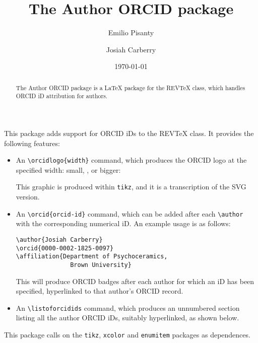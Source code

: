 \documentclass[%
  reprint,
  aps,
  pra,
  superscriptaddress,
  a4paper,
]{revtex4-2}
\begin{document}
\title{The Author ORCID package}

\author{Emilio Pisanty}

\author{Josiah Carberry}

\date{\today}

\begin{abstract}
The Author ORCID package is a {\LaTeX} package for the REVTeX class, which handles ORCID iD attribution for authors.
\end{abstract}

\maketitle


This package adds support for ORCID iDs to the REVTeX class. It provides the following features:

\begin{itemize}
\item
An \verb|\orcidlogo{width}| command, which produces the ORCID logo at the specified width: small, \orcidlogo{8pt}, or bigger:

\orcidlogo{20pt}

This graphic is produced within \texttt{tikz}, and it is a transcription of the SVG version.

\item
An \verb|\orcid{orcid-id}| command, which can be added after each \verb|\author| with the corresponding numerical iD. 
An example usage is as follows:
\begin{verbatim}
\author{Josiah Carberry}
\orcid{0000-0002-1825-0097}
\affiliation{Department of Psychoceramics, 
               Brown University}
\end{verbatim}
This will produce ORCID badges after each author for which an iD has been specified, hyperlinked to that author's ORCID record.


\item
An \verb|\listoforcidids| command, which produces an unnumbered section listing all the author ORCID iDs, suitably hyperlinked, as shown below.

\end{itemize}

This package calls on the \texttt{tikz}, \texttt{xcolor} and \texttt{enumitem} packages as dependences.
\end{document}
